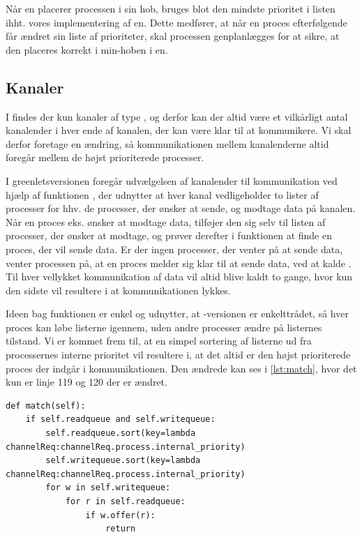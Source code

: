 Når \sched en placerer processen i sin hob, bruges blot den mindste prioritet i listen ihht. vores implementering af \sched en. Dette medfører, at når en proces efterfølgende  får ændret sin liste af prioriteter, skal processen genplanlægges for at sikre, at den placeres korrekt i min-hoben i \sched en. 

\subsection{Kanaler}
I \pycsp findes der kun kanaler af type , og derfor kan der altid  være et vilkårligt antal kanalender i hver ende af kanalen, der kan være klar til at kommunikere. Vi skal derfor foretage en ændring, så kommunikationen mellem kanalenderne altid foregår mellem de højst prioriterede processer. 

I greenletsversionen foregår udvælgelsen af kanalender til kommunikation ved hjælp af funktionen , der udnytter at  hver kanal vedligeholder to lister af processer for hhv. de processer, der ønsker at sende, og modtage data på kanalen. Når en proces eks. ønsker at modtage data, tilføjer den sig selv til listen af processer, der ønsker at modtage, og prøver derefter i  funktionen at finde en proces, der vil sende data. Er der ingen processer, der venter på at sende data, venter processen på, at en proces melder sig klar til at sende data, ved at kalde . Til hver vellykket kommunikation af data vil  altid blive kaldt to gange, hvor kun den sidste vil resultere i at kommunikationen lykkes.

Ideen bag funktionen  er enkel og  udnytter, at -versionen er enkelttrådet, så hver proces kan løbe listerne igennem, uden andre processer ændre på listernes tilstand.  Vi er kommet frem til, at  en simpel sortering af listerne ud fra processernes interne prioritet vil resultere i, at det altid er den højst prioriterede proces der indgår i kommunikationen. Den ændrede  kan ses i \cref{lst:match}, hvor det kun er linje 119 og 120 der er ændret.

\begin{lstlisting}[firstnumber=117 ,float=hbtp, label=lst:match, caption=Funktionen \code{match} der sorterer kanalrequests.]
def match(self):        
    if self.readqueue and self.writequeue:
        self.readqueue.sort(key=lambda channelReq:channelReq.process.internal_priority)
        self.writequeue.sort(key=lambda channelReq:channelReq.process.internal_priority)
        for w in self.writequeue:
            for r in self.readqueue:
                if w.offer(r):
                    return       
\end{lstlisting}

